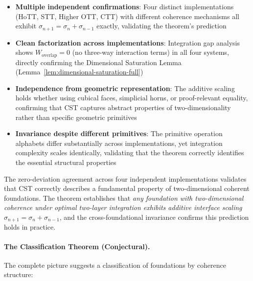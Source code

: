 \documentclass[11pt]{article}
\theoremstyle{definition}
\theoremstyle{remark}
\begin{document}
\begin{itemize}
\item \textbf{Multiple independent confirmations}: Four distinct implementations (HoTT, STT, Higher OTT, CTT) with different coherence mechanisms all exhibit $\sigma_{n+1} = \sigma_n + \sigma_{n-1}$ exactly, validating the theorem's prediction

\item \textbf{Clean factorization across implementations}: Integration gap analysis shows $W_{\text{overlap}} = 0$ (no three-way interaction terms) in all four systems, directly confirming the Dimensional Saturation Lemma (Lemma~\ref{lem:dimensional-saturation-full})

\item \textbf{Independence from geometric representation}: The additive scaling holds whether using cubical faces, simplicial horns, or proof-relevant equality, confirming that CST captures abstract properties of two-dimensionality rather than specific geometric primitives

\item \textbf{Invariance despite different primitives}: The primitive operation alphabets differ substantially across implementations, yet integration complexity scales identically, validating that the theorem correctly identifies the essential structural properties
\end{itemize}

The zero-deviation agreement across four independent implementations validates that CST correctly describes a fundamental property of two-dimensional coherent foundations. The theorem establishes that \textit{any foundation with two-dimensional coherence under optimal two-layer integration exhibits additive interface scaling $\sigma_{n+1} = \sigma_n + \sigma_{n-1}$}, and the cross-foundational invariance confirms this prediction holds in practice.

\paragraph{The Classification Theorem (Conjectural).}

The complete picture suggests a classification of foundations by coherence structure:
\end{document}
